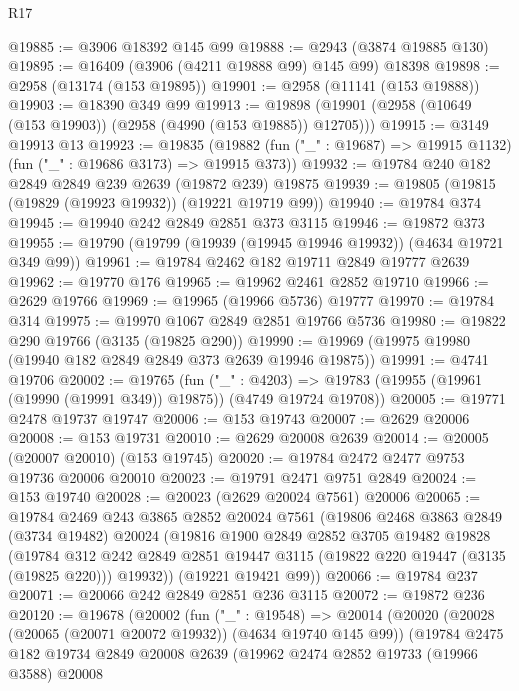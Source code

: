 \begin{lexlean}{R17}
\begin{coremodule}
@19885 := @3906 @18392 @145 @99
@19888 := @2943 (@3874 @19885 @130)
@19895 := @16409 (@3906 (@4211 @19888 @99) @145 @99) @18398
@19898 := @2958 (@13174 (@153 @19895))
@19901 := @2958 (@11141 (@153 @19888))
@19903 := @18390 @349 @99
@19913 := @19898 (@19901 (@2958 (@10649 (@153 @19903)) (@2958 (@4990 (@153 @19885)) @12705)))
@19915 := @3149 @19913 @13
@19923 := @19835
    (@19882 (fun ("_" : @19687) => @19915 @1132) (fun ("_" : @19686 @3173) => @19915 @373))
@19932 := @19784 @240 @182 @2849 @2849 @239 @2639 (@19872 @239) @19875
@19939 := @19805 (@19815 (@19829 (@19923 @19932)) (@19221 @19719 @99))
@19940 := @19784 @374
@19945 := @19940 @242 @2849 @2851 @373 @3115
@19946 := @19872 @373
@19955 := @19790 (@19799 (@19939 (@19945 @19946 @19932)) (@4634 @19721 @349 @99))
@19961 := @19784 @2462 @182 @19711 @2849 @19777 @2639
@19962 := @19770 @176
@19965 := @19962 @2461 @2852 @19710
@19966 := @2629 @19766
@19969 := @19965 (@19966 @5736) @19777
@19970 := @19784 @314
@19975 := @19970 @1067 @2849 @2851 @19766 @5736
@19980 := @19822 @290 @19766 (@3135 (@19825 @290))
@19990 := @19969 (@19975 @19980 (@19940 @182 @2849 @2849 @373 @2639 @19946 @19875))
@19991 := @4741 @19706
@20002 := @19765
    (fun ("_" : @4203) =>
    @19783 (@19955 (@19961 (@19990 (@19991 @349)) @19875)) (@4749 @19724 @19708))
@20005 := @19771 @2478 @19737 @19747
@20006 := @153 @19743
@20007 := @2629 @20006
@20008 := @153 @19731
@20010 := @2629 @20008 @2639
@20014 := @20005 (@20007 @20010) (@153 @19745)
@20020 := @19784 @2472 @2477 @9753 @19736 @20006 @20010
@20023 := @19791 @2471 @9751 @2849
@20024 := @153 @19740
@20028 := @20023 (@2629 @20024 @7561) @20006
@20065 := @19784
    @2469
    @243
    @3865
    @2852
    @20024
    @7561
    (@19806
      @2468
      @3863
      @2849
      (@3734 @19482)
      @20024
      (@19816
        @1900
        @2849
        @2852
        @3705
        @19482
        @19828
        (@19784
          @312
          @242
          @2849
          @2851
          @19447
          @3115
          (@19822 @220 @19447 (@3135 (@19825 @220)))
          @19932))
      (@19221 @19421 @99))
@20066 := @19784 @237
@20071 := @20066 @242 @2849 @2851 @236 @3115
@20072 := @19872 @236
@20120 := @19678
    (@20002
      (fun ("_" : @19548) =>
      @20014
        (@20020
          (@20028 (@20065 (@20071 @20072 @19932)) (@4634 @19740 @145 @99))
          (@19784
            @2475
            @182
            @19734
            @2849
            @20008
            @2639
            (@19962
              @2474
              @2852
              @19733
              (@19966 @3588)
              @20008

\end{coremodule}
\end{lexlean}
